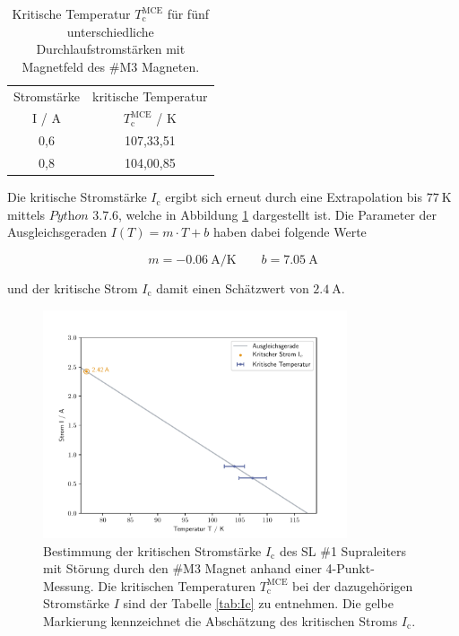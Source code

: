 \begin{table}
  \centering
  \caption{Kritische Temperatur $T^{\text{MCE}}_{\text{c}}$ für fünf unterschiedliche
	Durchlaufstromstärken mit Magnetfeld des \#M3 Magneten.}
  \label{tab:Ic2}
  \begin{tabular}{S | S}
    \toprule
    {Stromstärke} & {kritische Temperatur} \\
    {I / A} & {$T^{\text{MCE}}_{\text{c}}$ / K }  \\
    \midrule
		{0,6} & {107,33,51}	\\
		{0,8} & {104,00,85}	\\
    \bottomrule
  \end{tabular}
\end{table}

\noindent
Die kritische Stromstärke $I_{\text{c}}$ ergibt sich erneut durch eine Extrapolation
bis $\SI{77}{\kelvin}$ mittels $\textit{Python 3.7.6}$, welche in Abbildung
\ref{fig:Ic2} dargestellt ist. Die Parameter der Ausgleichsgeraden
$I(T)=m\cdot T + b$ haben dabei folgende Werte

\begin{equation*}
	m = \SI{-0.06}{\ampere\per\kelvin}
	\qquad
	b = \SI{7.05}{\ampere}
	\label{AF5}
\end{equation*}

\noindent
und der kritische Strom $I_{\text{c}}$ damit einen Schätzwert von $\SI{2.4}{\ampere}$.

\begin{figure}[H]
    \centering
    \includegraphics[width=0.8\textwidth]{Auswertung/I_krit_Pt_b/I_krit.pdf}
    \caption{Bestimmung der kritischen Stromstärke $I_{\text{c}}$ des SL \#1
		Supraleiters mit Störung durch den \#M3 Magnet anhand einer 4-Punkt-Messung.
		Die kritischen Temperaturen $T^{\text{MCE}}_{\text{c}}$
		bei der dazugehörigen Stromstärke $I$ sind der Tabelle \ref{tab:Ic} zu entnehmen.
		Die gelbe Markierung kennzeichnet die Abschätzung des kritischen Stroms $I_{\text{c}}$.}
\label{fig:Ic2}
\end{figure}


